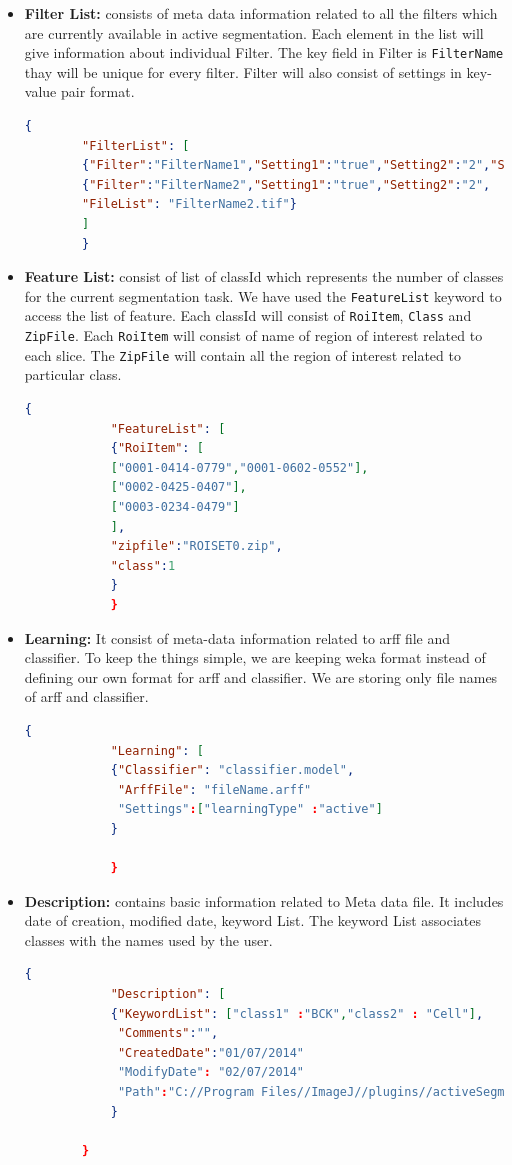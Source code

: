 \documentclass[a4paper,10pt]{article}
\begin{document}
	\begin{itemize}
		\item \textbf{Filter List: } consists of meta data information related to all the filters which are currently available in active segmentation. Each element in the list will give information about individual Filter. The key field in Filter is \texttt{FilterName} thay will be unique for every filter. Filter will also consist of settings in key- value pair format.
		\begin{lstlisting}[language=json,firstnumber=1]
		{
		"FilterList": [
		{"Filter":"FilterName1","Setting1":"true","Setting2":"2","Setting3":"false", "FileList": "FilterName1.tif"},
		{"Filter":"FilterName2","Setting1":"true","Setting2":"2",
		"FileList": "FilterName2.tif"}
		]
		}
		\end{lstlisting}
		
		\item \textbf{Feature List: } consist of list of classId which represents the number of classes for the current segmentation task. We have used the \texttt{FeatureList} keyword to access the list of feature. Each classId will consist of \texttt{RoiItem}, \texttt{Class} and \texttt{ZipFile}. Each \texttt{RoiItem} will consist of name of region of interest related to each slice. The \texttt{ZipFile} will contain all the region of interest related to particular class. 
		
			\begin{lstlisting}[language=json,firstnumber=1]
			{
			"FeatureList": [
			{"RoiItem": [
			["0001-0414-0779","0001-0602-0552"],
			["0002-0425-0407"],
			["0003-0234-0479"]
			],
			"zipfile":"ROISET0.zip",
			"class":1
			}
			}
			\end{lstlisting}
		\item \textbf{Learning: } It consist of meta-data information related to arff file and classifier. To keep the things simple, we are keeping weka format instead of defining our own format for arff and classifier. We are storing only file names of arff and classifier.
			\begin{lstlisting}[language=json,firstnumber=1]
			{
			"Learning": [
			{"Classifier": "classifier.model",
			 "ArffFile": "fileName.arff"
			 "Settings":["learningType" :"active"]
			}
			
			}
			\end{lstlisting}
		
		
		\item \textbf{Description: } contains basic information related to Meta data file. It includes date of creation,  modified date, keyword List. The keyword List associates classes with the names used by the user.
		\begin{lstlisting}[language=json,firstnumber=1]
		{
			"Description": [
			{"KeywordList": ["class1" :"BCK","class2" : "Cell"],
			 "Comments":"",
			 "CreatedDate":"01/07/2014"
		   	 "ModifyDate": "02/07/2014"
		   	 "Path":"C://Program Files//ImageJ//plugins//activeSegmentation//"
	    	}
				
		}
		\end{lstlisting}
	
			
	\end{itemize}
	
	
	
	
\end{document}
